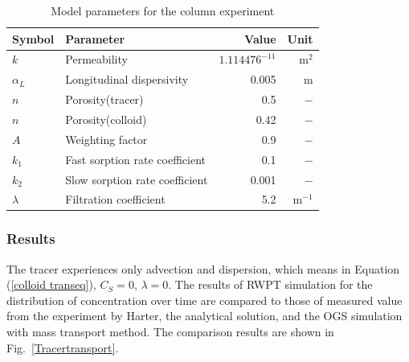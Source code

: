 \begin{table}[htbp!]
\caption{\label{tab-colloid}Model parameters for the column experiment}
\begin{center}
\begin{tabular}{llrr}
\toprule
Symbol & Parameter & Value & Unit \\
\midrule
$k$         & Permeability                    & $1.114476^{-11}$   & m$^{2}$ \\			
$\alpha _L$	& Longitudinal dispersivity       & 0.005              & m \\
$n$         & Porosity(tracer) 		            & 0.5                & $-$ \\
$n$         & Porosity(colloid)               & 0.42               & $-$ \\
$A$         & Weighting factor 		            & 0.9                & $-$ \\
$k_{1}$     & Fast sorption rate coefficient	& 0.1                & $-$ \\
$k_{2}$     & Slow sorption rate coefficient	& 0.001              & $-$ \\
$\lambda$   & Filtration coefficient        	& 5.2                & m$^{-1}$ \\
\bottomrule
\end{tabular}
\end{center}
\end{table}

\subsubsection{Results}

The tracer experiences only advection and dispersion, which means in Equation (\ref{colloid transeq}), $C_S = 0$, $\lambda = 0$. The results of RWPT simulation for the distribution of concentration over time are compared to those of measured value from the experiment by Harter, the analytical solution, and the OGS simulation with mass transport method. The comparison results are shown in Fig.~\ref{Tracertransport}.

